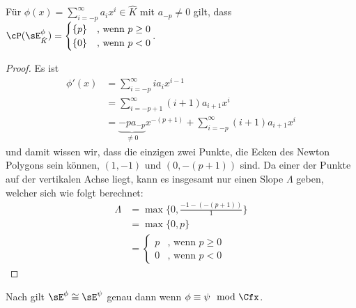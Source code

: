 \begin{lem}
Für $\phi(x)=\sum_{i=-p}^\infty a_ix^i\in\hat K$ mit $a_{-p}\neq0$ gilt, dass
$\cP(\sE_{\hat K}^\phi)=
\begin{cases}
\{p\} &\text{, wenn }p\geq0
\\\{0\} &\text{, wenn }p<0
\end{cases}
$.
\end{lem}
\begin{proof} 
Es ist 
\begin{align*}
\phi'(x) &=\sum_{i=-p}^\infty ia_ix^{i-1}
\\&=\sum_{i=-{p+1}}^\infty (i+1)a_{i+1}x^{i}
\\&=\underset{\neq0}{\underbrace{-pa_{-p}}}x^{-(p+1)}
  +\sum_{i=-{p}}^\infty (i+1)a_{i+1}x^{i}
\end{align*}
und damit wissen wir, dass die einzigen zwei Punkte, die Ecken des Newton
Polygons sein können, $(1,-1)$ und $(0,-(p+1))$ sind. Da einer der Punkte auf
der vertikalen Achse liegt, kann es insgesamt nur einen Slope $\Lambda$ geben,
welcher sich wie folgt berechnet:
\begin{align*}
\Lambda&=\max\{0,\frac{-1-(-(p+1))}{1}\}
\\&=\max\{0,p\}
\\&=\begin{cases}
  p &\text{, wenn }p\geq0
\\0 &\text{, wenn }p<0
\end{cases}
\end{align*}

\iffalse
\begin{figure}[H] %
\begin{center}
  \begin{tikzpicture}[scale=1,descr/.style={fill=white,inner sep=2.5pt}]
  \def\myPoints{0/-6,1/-1}
  \def\myPath{ -- node[descr]{$p$} (1,-1)}
  \myPlotFunction[nogrid]{\myPoints}{\myPath}{1}{-6}{0}{$N(\sE_{\hat K}^\phi)$}
  \end{tikzpicture}
\end{center}
\caption{Newton Polygon zu $\sE_{\hat K}^\phi$}
\end{figure}
\fi
\end{proof}

\begin{bem} \label{bem:FormRang1VR}
Nach \cite[1.a]{sabbah_Fourier-local} gilt $\sE^\phi\cong\sE^\psi$ genau dann
wenn $\phi\equiv\psi \mod \Cfx$.
\end{bem}

